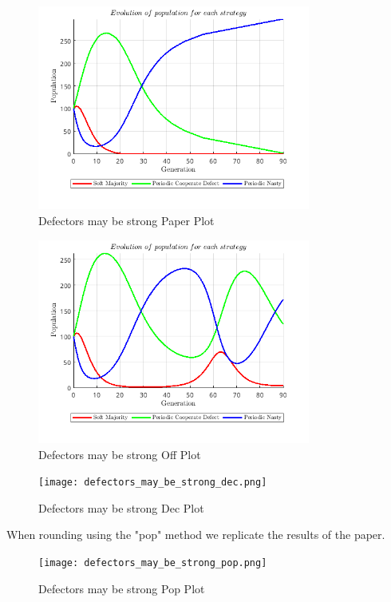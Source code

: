 \documentclass[12pt]{report}
\begin{document}
\begin{figure}[H]
    \centering
    \includegraphics[width=0.8\textwidth]{defectors_may_be_strong_paper.png}
    \caption{Defectors may be strong Paper Plot}
\end{figure}
\begin{figure}[H]
    \centering
    \includegraphics[width=0.8\textwidth]{defectors_may_be_strong_off.png}
    \caption{Defectors may be strong Off Plot}
\end{figure}
\begin{figure}[H]
    \centering
    \texttt{[image: defectors\_may\_be\_strong\_dec.png]}
    \caption{Defectors may be strong Dec Plot}
\end{figure}
When rounding using the "pop" method we replicate the results of the paper.
\begin{figure}[H]
    \centering
    \texttt{[image: defectors\_may\_be\_strong\_pop.png]}
    \caption{Defectors may be strong Pop Plot}
\end{figure}
\end{document}
